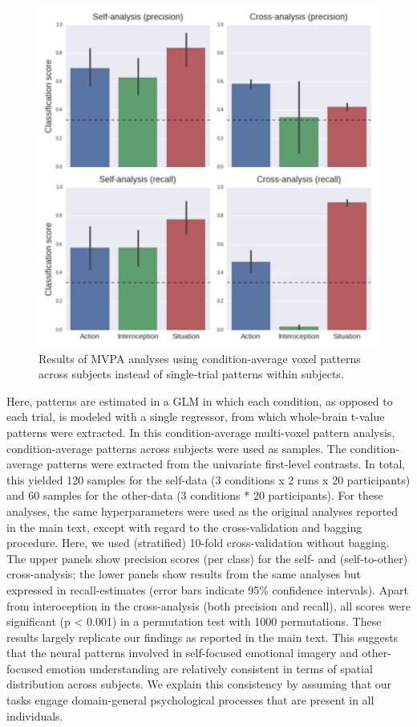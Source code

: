 \documentclass[12pt,american,a4paper,oneside,]{memoir} %
\begin{document}
\begin{figure}
\centering
\includegraphics{_bookdown_files/shared-states-files/figures/figure_S8.pdf}
\caption{\label{fig:fig-shared-states-S8}Results of MVPA analyses using condition-average voxel patterns across subjects instead of single-trial patterns within subjects.}
\end{figure}



Here, patterns are estimated in a GLM in which each condition, as opposed to each trial, is modeled with a single regressor, from which whole-brain t-value patterns were extracted. In this condition-average multi-voxel pattern analysis, condition-average patterns across subjects were used as samples. The condition-average patterns were extracted from the univariate first-level contrasts. In total, this yielded 120 samples for the self-data (3 conditions x 2 runs x 20 participants) and 60 samples for the other-data (3 conditions * 20 participants). For these analyses, the same hyperparameters were used as the original analyses reported in the main text, except with regard to the cross-validation and bagging procedure. Here, we used (stratified) 10-fold cross-validation without bagging. The upper panels show precision scores (per class) for the self- and (self-to-other) cross-analysis; the lower panels show results from the same analyses but expressed in recall-estimates (error bars indicate 95\% confidence intervals). Apart from interoception in the cross-analysis (both precision and recall), all scores were significant (p \textless{} 0.001) in a permutation test with 1000 permutations. These results largely replicate our findings as reported in the main text. This suggests that the neural patterns involved in self-focused emotional imagery and other-focused emotion understanding are relatively consistent in terms of spatial distribution across subjects. We explain this consistency by assuming that our tasks engage domain-general psychological processes that are present in all individuals.
\end{document}
